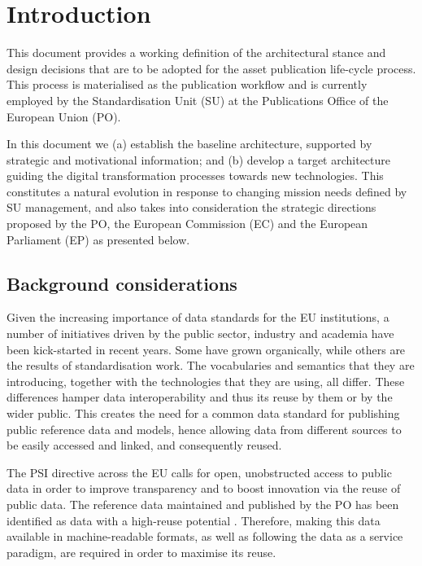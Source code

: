 \chapter{Introduction}
\label{sec:introduction}
	
	This document provides a working definition of the architectural stance and design decisions that are to be adopted for the asset publication life-cycle process. This process is materialised as the publication workflow and is currently employed by the Standardisation Unit (SU) at the Publications Office of the European Union (PO).
	
	In this document we (a) establish the baseline architecture, supported by  strategic and motivational information; and (b) develop a target architecture guiding the digital transformation processes towards new technologies. This constitutes a natural evolution in response to changing mission needs defined by SU management, and also takes into consideration the strategic directions proposed by the PO, the European Commission (EC) and the European Parliament (EP) as presented below.
	
	\section{Background considerations}
	
	Given the increasing importance of data standards for the EU institutions, a number of initiatives driven by the public sector, industry and academia have been kick-started in recent years. Some have grown organically, while others are the results of standardisation work. The vocabularies and semantics that they are introducing, together with the technologies that they are using, all differ. These differences hamper data interoperability and thus its reuse by them or by the wider public. This creates the need for a common data standard for publishing public reference data and models, hence allowing data from different sources to be easily accessed and linked, and consequently reused.
	
	The PSI directive \cite{directive-2019/1024} across the EU calls for open, unobstructed access to public data in order to improve transparency and to boost innovation via the reuse of public data. The reference data maintained and published by the PO has been identified as data with a high-reuse potential \cite{d-high-value-assets}. Therefore, making this data available in machine-readable formats, as well as following the data as a service paradigm, are required in order to maximise its reuse.
	
